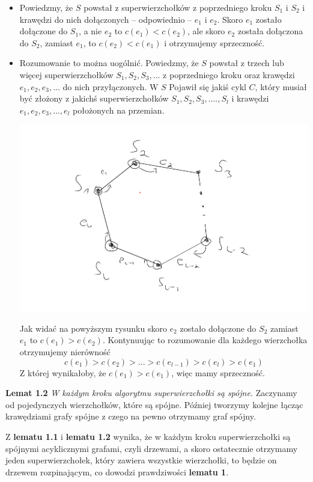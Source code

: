 \documentclass[12pt,a4paper]{article}
\begin{document}
\begin{itemize}
	\item Powiedzmy, że \(S\) powstał z superwierzchołków z poprzedniego kroku \(S_1\) i \(S_2\) 
	i krawędzi do nich dołączonych -- odpowiednio -- \(e_1\) i \(e_2\). Skoro \(e_1\) 
	zostało dołączone do 
	\(S_1\), a	 nie \( e_2 \) to  \( c(e_1) < c(e_2) \), ale skoro \(e_2\) została dołączona do 
	\(S_2\), zamiast \(e_1\), to \( c(e_2) < c(e_1) \) i otrzymujemy sprzeczność.
	\item Rozumowanie to można uogólnić. Powiedzmy, że \(S\) powstał z trzech lub więcej
	superwierzchołków \(S_1, S_2, S_3, ... \) z poprzedniego
	kroku oraz krawędzi \( e_1, e_2, e_3, ... \) do nich przyłączonych. W \(S\) Pojawił się jakiś 
	cykl \(C\), który musiał być złożony z jakichś superwierzchołków \(S_1, S_2, S_3, ...., S_l\) i 
	krawędzi \( e_1, e_2, e_3, ..., e_l \) położonych na przemian.
	\begin{center}
		\includegraphics[scale=0.5]{boruvka} 
	\end{center}
	Jak widać na powyższym rysunku skoro \( e_2 \) zostało dołączone do \(S_2\) zamiast \(e_1\) to 
	\(c(e_1) > c(e_2)\). Kontynuując to rozumowanie dla każdego wierzchołka otrzymujemy nierówność
	\[ c(e_1) > c(e_2) > ... > c(e_{l-1}) > c(e_l) > c(e_1) \]
	Z której wynikałoby, że \( c(e_1) > c(e_1) \), więc mamy sprzeczność.
\end{itemize}

\vskip 0.5cm
\noindent
\textbf{Lemat 1.2} \emph{W każdym kroku algorytmu superwierzchołki są spójne.} Zaczynamy od pojedynczych wierzchołków, które są spójne. Później tworzymy kolejne łącząc krawędziami grafy spójne z czego na pewno otrzymamy graf spójny.

\vskip 0.5cm
\noindent
Z \textbf{lematu 1.1} i \textbf{lematu 1.2} wynika, że w każdym kroku superwierzchołki są spójnymi acyklicznymi grafami, czyli drzewami, a skoro ostatecznie otrzymamy jeden superwierzchołek, który zawiera wszystkie wierzchołki, to będzie on drzewem rozpinającym, co dowodzi prawdziwości \textbf{lematu 1}.
\end{document}

